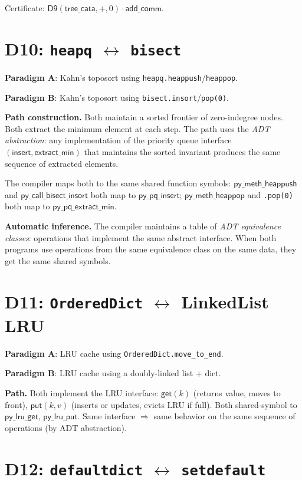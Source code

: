 Certificate: $\mathsf{D9}(\mathsf{tree\_cata}, +, 0) \cdot
\mathsf{add\_comm}$.

\section{D10: \texttt{heapq} $\leftrightarrow$ \texttt{bisect}}

\textbf{Paradigm A}: Kahn's toposort using \texttt{heapq.heappush}/\texttt{heappop}.

\textbf{Paradigm B}: Kahn's toposort using \texttt{bisect.insort}/\texttt{pop(0)}.

\textbf{Path construction.}
Both maintain a sorted frontier of zero-indegree nodes.  Both extract
the minimum element at each step.  The path uses the \emph{ADT
abstraction}: any implementation of the priority queue interface
$(\mathsf{insert}, \mathsf{extract\_min})$ that maintains the
sorted invariant produces the same sequence of extracted elements.

The compiler maps both to the same shared function symbols:
$\mathsf{py\_meth\_heappush}$ and $\mathsf{py\_call\_bisect\_insort}$
both map to $\mathsf{py\_pq\_insert}$; $\mathsf{py\_meth\_heappop}$
and \texttt{.pop(0)} both map to $\mathsf{py\_pq\_extract\_min}$.

\textbf{Automatic inference.}
The compiler maintains a table of \emph{ADT equivalence classes}:
operations that implement the same abstract interface.  When both
programs use operations from the same equivalence class on the
same data, they get the same shared symbols.

\section{D11: \texttt{OrderedDict} $\leftrightarrow$ LinkedList LRU}

\textbf{Paradigm A}: LRU cache using \texttt{OrderedDict.move\_to\_end}.

\textbf{Paradigm B}: LRU cache using a doubly-linked list + dict.

\textbf{Path.}
Both implement the LRU interface: $\mathsf{get}(k)$ (returns value,
moves to front), $\mathsf{put}(k, v)$ (inserts or updates, evicts
LRU if full).  Both shared-symbol to $\mathsf{py\_lru\_get}$,
$\mathsf{py\_lru\_put}$.  Same interface $\Rightarrow$ same behavior
on the same sequence of operations (by ADT abstraction).

\section{D12: \texttt{defaultdict} $\leftrightarrow$ \texttt{setdefault}}

